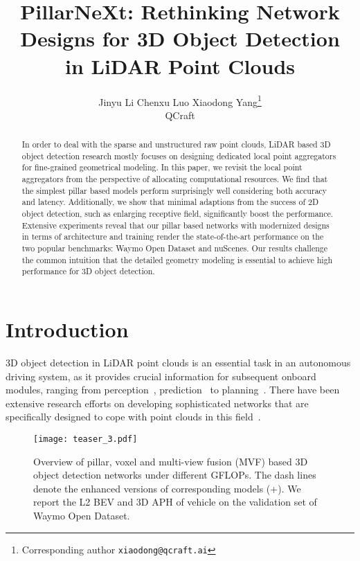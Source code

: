 \documentclass[10pt,twocolumn,letterpaper]{article}
\begin{document}
\title{PillarNeXt: Rethinking Network Designs for 3D Object Detection\\ in LiDAR Point Clouds}

\author{Jinyu Li \qquad Chenxu Luo \qquad Xiaodong Yang\thanks{Corresponding author \texttt{xiaodong@qcraft.ai}}\\
QCraft\\
}
\maketitle

\begin{abstract}
In order to deal with the sparse and unstructured raw point clouds, LiDAR based 3D object detection research mostly focuses on designing dedicated local point aggregators for fine-grained geometrical modeling. In this paper, we revisit the local point aggregators from the perspective of allocating computational resources. We find that the simplest pillar based models perform surprisingly well considering both accuracy and latency. Additionally, we show that minimal adaptions from the success of 2D object detection, such as enlarging receptive field, significantly boost the performance. Extensive experiments reveal that our pillar based networks with modernized designs in terms of architecture and training render the state-of-the-art performance on the two popular benchmarks: Waymo Open Dataset and nuScenes. Our results challenge the common intuition that the detailed geometry modeling is essential to achieve high performance for 3D object detection.
\end{abstract}

\section{Introduction}
\label{sec:intro}
3D object detection in LiDAR point clouds is an essential task in an autonomous driving system, as it provides crucial information for subsequent onboard modules, ranging from perception~\cite{simtrack, pillar-motion}, prediction~\cite{prophnet, wayformer} to planning~\cite{plan1, plan2}. There have been extensive research efforts on developing sophisticated networks that are specifically designed to cope with point clouds in this field~\cite{lang2019pointpillars, shi2022pillarnet, shi2021pv, zhou2018voxelnet, wang2020pillar}. 

\begin{figure}[t]
  \centering
   \texttt{[image: teaser\_3.pdf]}
   \vspace{-7mm}
   \caption{Overview of pillar, voxel and multi-view fusion (MVF) based 3D object detection networks under different GFLOPs. The dash lines denote the enhanced versions of corresponding models (+). We report the L2 BEV and 3D APH of vehicle on the validation set of Waymo Open Dataset.}  
   \vspace{-2mm}
   \label{fig:teaser}
\end{figure}
\end{document}
